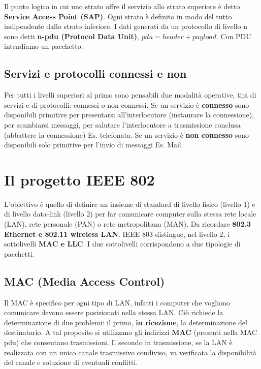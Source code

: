 \documentclass{article}
\begin{document}
\noindent
Il punto logico in cui uno strato offre il servizio allo strato superiore è detto \textbf{Service Access Point (SAP)}. Ogni strato è definito in modo del tutto indipendente dallo strato inferiore. I dati generati da un protocollo di livello n sono detti \textbf{n-pdu (Protocol Data Unit)}, $pdu=header+payload$. Con PDU intendiamo un pacchetto.
\\
\subsection{Servizi e protocolli connessi e non}
Per tutti i livelli superiori al primo sono pensabili due modalità operative, tipi di servizi e di protocolli: connessi o non connessi. Se un servizio è \textbf{connesso} sono disponibili primitive per presentarsi all'interlocutore (instaurare la connessione), per scambiarsi messaggi, per salutare l'interlocutore a trasmissione conclusa (abbattere la connessione) Es. telefonata. Se un servizio è \textbf{non connesso} sono disponibili solo primitive per l'invio di messaggi Es. Mail.
\section{Il progetto IEEE 802}
L'obiettivo è quello di definire un insieme di standard di livello fisico (livello 1) e di livello data-link (livello 2) per far comunicare computer sulla stessa rete locale (LAN), rete personale (PAN) o rete metropolitana (MAN). Da ricordare \textbf{802.3 Ethernet e 802.11 wireless LAN}. IEEE 803 distingue, nel livello 2, i sottolivelli \textbf{MAC e LLC}. I due sottolivelli corrispondono a due tipologie di pacchetti.
\subsection{MAC (Media Access Control)}
Il MAC è specifico per ogni tipo di LAN, infatti i computer che vogliono comunicare devono essere posizionati nella stessa LAN. Ciò richiede la determinazione di due problemi: il primo, \textbf{in ricezione}, la determinazione del destinatario. A tal proposito si utilizzano gli indirizzi \textbf{MAC} (presenti nella MAC pdu) che consentano trasmissioni. Il secondo in trasmissione, se la LAN è realizzata con un unico canale trasmissivo condiviso, va verificata la disponibilità del canale e soluzione di eventuali conflitti.
\end{document}

